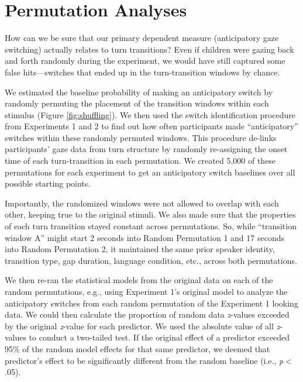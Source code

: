\documentclass[authoryear, 12pt]{elsarticle}
\begin{document}


\clearpage

\appendix

\section{Permutation Analyses}
\label{sec:permutation}
\setcounter{figure}{0}
\setcounter{table}{0}
How can we be sure that our primary dependent measure (anticipatory gaze switching) actually relates to turn transitions? Even if children were gazing back and forth randomly during the experiment, we would have still captured some false hits---switches that ended up in the turn-transition windows by chance.

We estimated the baseline probability of making an anticipatory switch by randomly permuting the placement of the transition windows within each stimulus (Figure \ref{fig:shuffling}). We then used the switch identification procedure from Experiments 1 and 2 to find out how often participants made ``anticipatory'' switches within these randomly permuted windows. This procedure de-links participants' gaze data from turn structure by randomly re-assigning the onset time of each turn-transition in each permutation. We created 5,000 of these permutations for each experiment to get an anticipatory switch baselines over all possible starting points.

Importantly, the randomized windows were not allowed to overlap with each other, keeping true to the original stimuli. We also made sure that the properties of each turn transition stayed constant across permutations. So, while ``transition window A'' might start 2 seconds into Random Permutation 1 and 17 seconds into Random Permutation 2, it maintained the same prior speaker identity, transition type, gap duration, language condition, etc., across both permutations.

We then re-ran the statistical models from the original data on each of the random permutations, e.g., using Experiment 1's original model to analyze the anticipatory switches from each random permutation of the Experiment 1 looking data. We could then calculate the proportion of random data \textit{z}-values exceeded by the original \textit{z}-value for each predictor. We used the absolute value of all \textit{z}-values to conduct a two-tailed test. If the original effect of a predictor exceeded 95\% of the random model effects for that same predictor, we deemed that predictor's effect to be significantly different from the random baseline (i.e., \textit{p}$<$.05).
\end{document}
